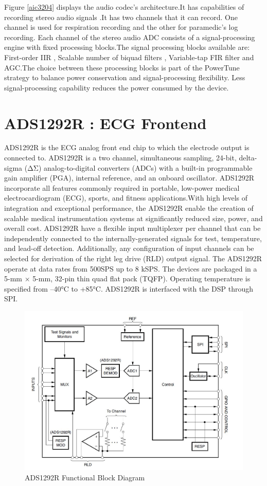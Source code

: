 Figure \ref{aic3204} displays the audio codec's architecture.It has capabilities of recording stereo audio signals .It has two channels that it can record. One channel is used for respiration recording and the other for paramedic's log recording.
Each
channel of the stereo audio ADC consists of a signal-processing engine with fixed processing blocks.The signal processing blocks available are:
First-order IIR
, Scalable number of biquad filters
, Variable-tap FIR filter
and AGC.The choice between these processing blocks is part of the PowerTune strategy to balance power
conservation and signal-processing flexibility. Less signal-processing capability reduces the power
consumed by the device.
\section{ADS1292R : ECG Frontend}
ADS1292R is the ECG analog front end chip to which the electrode output is connected to.
ADS1292R is a two channel, simultaneous sampling, 24-bit, delta-sigma (ΔΣ) analog-to-digital converters (ADCs) with a built-in programmable gain amplifier (PGA), internal reference, and an onboard oscillator.  ADS1292R incorporate all features commonly required in portable, low-power medical electrocardiogram (ECG), sports, and fitness applications.With high levels of integration and exceptional performance, the ADS1292R enable the creation of scalable medical instrumentation systems at significantly reduced size, power, and overall cost. ADS1292R have a flexible input multiplexer per channel that can be independently connected to the internally-generated signals for test, temperature, and lead-off detection. Additionally, any configuration of input channels can be selected for derivation of the right leg drive (RLD) output signal. The ADS1292R operate at data rates from 500SPS up to 8 kSPS. The devices are packaged in a 5-mm × 5-mm, 32-pin thin quad flat pack (TQFP). Operating temperature is specified from –40°C to +85°C. ADS1292R is interfaced with the DSP through SPI.
 \begin{figure}[h]
 	\centering
 	\includegraphics[scale = 0.5 ]{ADS1292R.JPG}
 	\caption{ADS1292R Functional Block Diagram\label{ADS1292R}}
 \end{figure}
 
